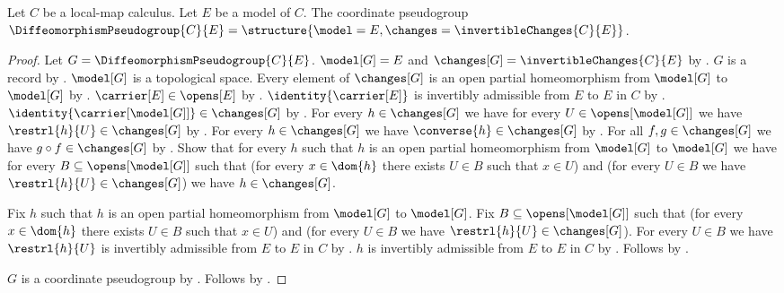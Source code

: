 \begin{construction}\label{diffeomorphism_pseudogroup}
    Let $C$ be a local-map calculus.
    Let $E$ be a model of $C$.
    The coordinate pseudogroup $\DiffeomorphismPseudogroup{C}{E}=
        \structure{\model=E,\changes=\invertibleChanges{C}{E}}$.
\end{construction}
\begin{proof}
    Let $G=\DiffeomorphismPseudogroup{C}{E}$.
    $\model[G]=E$ and $\changes[G]=\invertibleChanges{C}{E}$ by
        .
    $G$ is a record by .
    $\model[G]$ is a topological space.
    Every element of $\changes[G]$ is an open partial homeomorphism from
        $\model[G]$ to $\model[G]$ by
        .
    $\carrier[E]\in\opens[E]$ by .
    $\identity{\carrier[E]}$ is invertibly admissible from $E$ to $E$ in $C$ by
        .
    $\identity{\carrier[\model[G]]}\in\changes[G]$ by
        .
    For every $h\in\changes[G]$ we have for every $U\in\opens[\model[G]]$
        we have $\restrl{h}{U}\in\changes[G]$ by
        .
    For every $h\in\changes[G]$ we have $\converse{h}\in\changes[G]$ by
        .
    For all $f,g\in\changes[G]$ we have $g\circ f\in\changes[G]$ by
        .
    Show that for every $h$ such that $h$ is an open partial homeomorphism
        from $\model[G]$ to $\model[G]$ we have
        for every $B\subseteq\opens[\model[G]]$ such that
            (for every $x\in\dom{h}$ there exists $U\in B$ such that $x\in U$) and
            (for every $U\in B$ we have $\restrl{h}{U}\in\changes[G]$)
        we have $h\in\changes[G]$.
    \begin{subproof}
        Fix $h$ such that $h$ is an open partial homeomorphism
            from $\model[G]$ to $\model[G]$.
        Fix $B\subseteq\opens[\model[G]]$ such that
            (for every $x\in\dom{h}$ there exists $U\in B$ such that $x\in U$) and
            (for every $U\in B$ we have $\restrl{h}{U}\in\changes[G]$).
        For every $U\in B$ we have
            $\restrl{h}{U}$ is invertibly admissible from $E$ to $E$ in $C$ by
            .
        $h$ is invertibly admissible from $E$ to $E$ in $C$ by
            .
        Follows by .
    \end{subproof}
    $G$ is a coordinate pseudogroup by .
    Follows by .
\end{proof}

